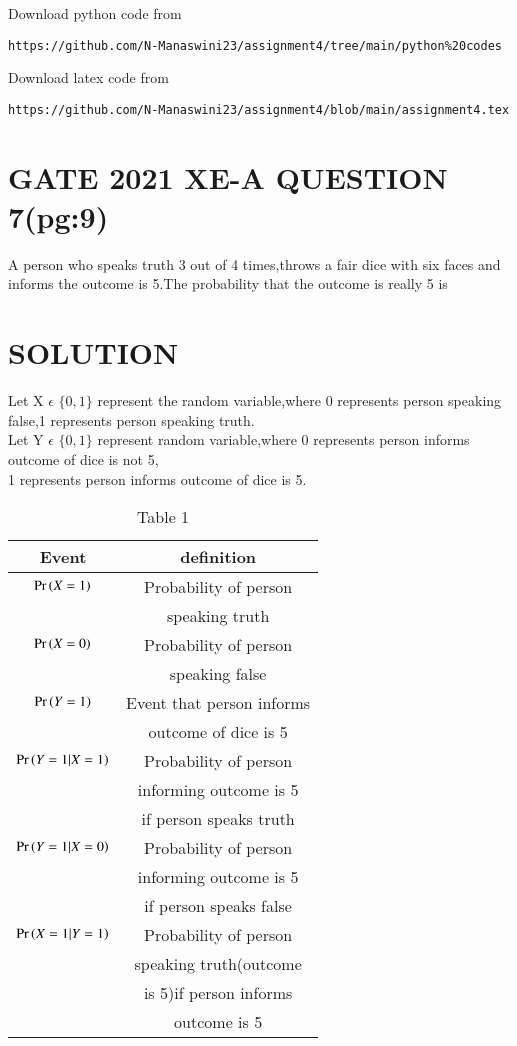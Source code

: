 \documentclass[journal,12pt,twocolumn]{IEEEtran}
\begin{document}
\renewcommand{\thefigure}{\theenumi}
\renewcommand{\thetable}{\theenumi}
Download python code from 
\begin{lstlisting}
https://github.com/N-Manaswini23/assignment4/tree/main/python%20codes
\end{lstlisting}
%
Download latex code from 
\begin{lstlisting}
https://github.com/N-Manaswini23/assignment4/blob/main/assignment4.tex
\end{lstlisting}
%

\section*{GATE 2021 XE-A QUESTION 7(pg:9)}
A person who speaks truth 3 out of 4 times,throws a fair dice with six faces and informs the outcome is 5.The probability that the outcome is really 5 is
\section*{SOLUTION}
Let X $\epsilon$ $ \{0,1\}$ represent the random variable,where 0 represents person speaking false,1 represents person speaking truth.\\
Let Y $\epsilon$ $ \{0,1\}$  represent random variable,where 0 represents person informs outcome of dice is not 5,\\
1 represents person informs  outcome of dice is 5.

\begin{table}[h!]
\resizebox{9cm}{!}
{ 
\begin{tabular}{|c|c|}
\hline
Event & definition \\
\hline
$ \Pr\left(X=1\right) $ & Probability of person \\
&speaking truth\\
\hline
$ \Pr\left(X=0\right) $ & Probability of person\\
& speaking false\\
\hline
$\Pr\left(Y=1\right)$ & Event that person informs\\
& outcome of dice is 5 \\
\hline
$\Pr\left(Y=1|X=1\right)$ & Probability of person \\
&  informing outcome is 5\\
& if person speaks truth\\
\hline
$\Pr\left(Y=1|X=0\right)$ & Probability of person\\
& informing outcome is 5\\
& if person speaks false\\ 
\hline
$\Pr\left(X=1|Y=1\right)$ & Probability of person\\
&  speaking truth(outcome  \\
& is 5)if person informs \\
&outcome is 5\\
\hline
\end{tabular}
}
\caption{Table 1} 
\label{tab:1}
\end{table}
\end{document}
